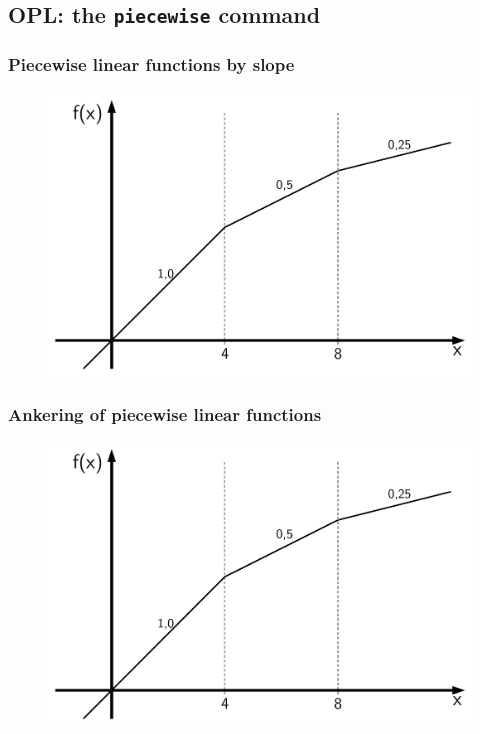 \subsection{OPL: the \texttt{piecewise} command}
\begin{frame}
 \frametitle{Piecewise linear functions by slope}
 \begin{figure}
  \centering
  \includegraphics[width=\linewidth,page=1]{Bilder/StueckweiseLineareFunktion3}
 \end{figure}
\end{frame}

\begin{frame}
 \frametitle{Ankering of piecewise linear functions}
 \begin{figure}
  \centering
  \includegraphics[width=\linewidth,page=2]{Bilder/StueckweiseLineareFunktion3}
 \end{figure}
\end{frame}

